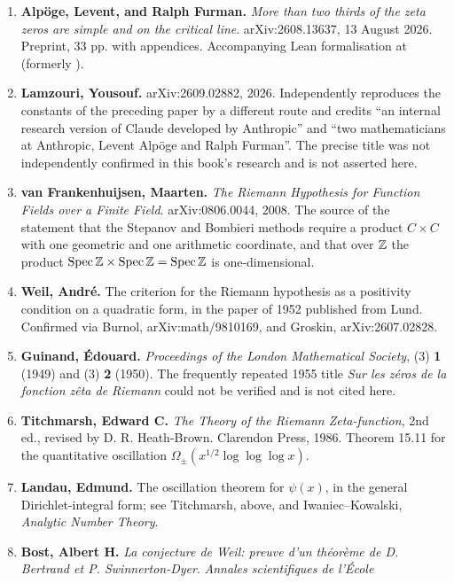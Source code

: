\begin{enumerate}[leftmargin=1.4em,itemsep=4pt,start=14]
\item \textbf{Alpöge, Levent, and Ralph Furman.} \emph{More than two thirds of
the zeta zeros are simple and on the critical line}. arXiv:2608.13637,
13 August 2026. Preprint, 33 pp. with appendices. Accompanying Lean
formalisation at  (formerly
).
\item \textbf{Lamzouri, Yousouf.} arXiv:2609.02882, 2026. Independently
reproduces the constants of the preceding paper by a different route and
credits ``an internal research version of Claude developed by Anthropic'' and
``two mathematicians at Anthropic, Levent Alpöge and Ralph Furman''. The
precise title was not independently confirmed in this book's research and is
not asserted here.
\item \textbf{van Frankenhuijsen, Maarten.} \emph{The Riemann Hypothesis for
Function Fields over a Finite Field}. arXiv:0806.0044, 2008. The source of the
statement that the Stepanov and Bombieri methods require a product $C \times C$
with one geometric and one arithmetic coordinate, and that over $\mathbb{Z}$ the
product $\operatorname{Spec}\mathbb{Z} \times \operatorname{Spec}\mathbb{Z} =
\operatorname{Spec}\mathbb{Z}$ is one-dimensional.
\item \textbf{Weil, André.} The criterion for the Riemann hypothesis as a
positivity condition on a quadratic form, in the paper of 1952 published from
Lund. Confirmed via Burnol, arXiv:math/9810169, and Groskin, arXiv:2607.02828.
\item \textbf{Guinand, Édouard.} \emph{Proceedings of the London Mathematical
Society}, (3) \textbf{1} (1949) and (3) \textbf{2} (1950). The frequently
repeated 1955 title \emph{Sur les zéros de la fonction zêta de Riemann} could
not be verified and is not cited here.
\item \textbf{Titchmarsh, Edward C.} \emph{The Theory of the Riemann
Zeta-function}, 2nd ed., revised by D. R. Heath-Brown. Clarendon Press, 1986.
Theorem 15.11 for the quantitative oscillation $\Omega_\pm(x^{1/2}\log\log\log x)$.
\item \textbf{Landau, Edmund.} The oscillation theorem for $\psi(x)$, in the
general Dirichlet-integral form; see Titchmarsh, above, and
Iwaniec--Kowalski, \emph{Analytic Number Theory}.
\item \textbf{Bost, Albert H.} \emph{La conjecture de Weil: preuve d'un théorème
de D. Bertrand et P. Swinnerton-Dyer}. \emph{Annales scientifiques de l'École
}
\end{enumerate}
